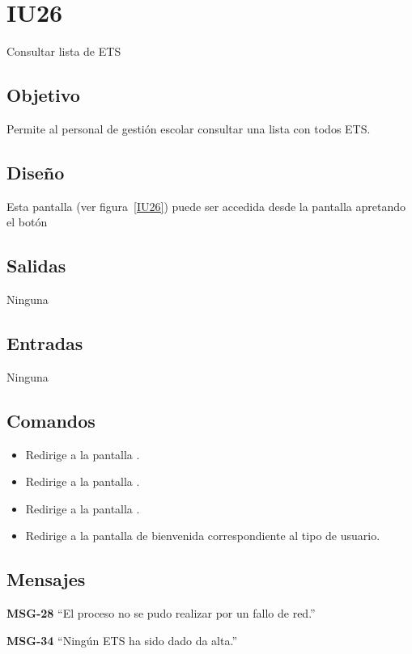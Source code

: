 
\section{IU26} {Consultar lista de ETS}
\subsection{Objetivo}
    Permite al personal de gestión escolar consultar una lista con todos ETS.
\subsection{Diseño}
    Esta pantalla  (ver figura~\ref{IU26}) puede ser accedida desde la pantalla  apretando el botón 

\subsection{Salidas}
Ninguna
\subsection{Entradas}
Ninguna
\subsection{Comandos}
\begin{itemize}
    \item {} Redirige a la pantalla .
    \item {} Redirige a la pantalla .
    \item {} Redirige a la pantalla .
    \item {} Redirige a la pantalla de bienvenida correspondiente al tipo de usuario.
    
\end{itemize}

\subsection{Mensajes}

\begin{Citemize}
    \item {\bf MSG-28}  ``El proceso no se pudo realizar por un fallo de red.''
    \item {\bf MSG-34}  ``Ningún ETS ha sido dado da alta.''
\end{Citemize}

